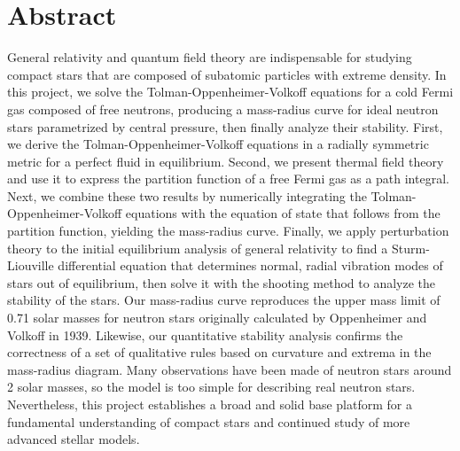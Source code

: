 \chapter*{Abstract}

General relativity and quantum field theory are indispensable for studying compact stars that are composed of subatomic particles with extreme density.
In this project, we solve the Tolman-Oppenheimer-Volkoff equations for a cold Fermi gas composed of free neutrons, producing a mass-radius curve for ideal neutron stars parametrized by central pressure, then finally analyze their stability.
First, we derive the Tolman-Oppenheimer-Volkoff equations in a radially symmetric metric for a perfect fluid in equilibrium.
Second, we present thermal field theory and use it to express the partition function of a free Fermi gas as a path integral.
Next, we combine these two results by numerically integrating the Tolman-Oppenheimer-Volkoff equations with the equation of state that follows from the partition function, yielding the mass-radius curve.
Finally, we apply perturbation theory to the initial equilibrium analysis of general relativity to find a Sturm-Liouville differential equation that determines normal, radial vibration modes of stars out of equilibrium, then solve it with the shooting method to analyze the stability of the stars.
Our mass-radius curve reproduces the upper mass limit of 0.71 solar masses for neutron stars originally calculated by Oppenheimer and Volkoff in 1939.
Likewise, our quantitative stability analysis confirms the correctness of a set of qualitative rules based on curvature and extrema in the mass-radius diagram.
Many observations have been made of neutron stars around 2 solar masses, so the model is too simple for describing real neutron stars.
Nevertheless, this project establishes a broad and solid base platform for a fundamental understanding of compact stars and continued study of more advanced stellar models.


